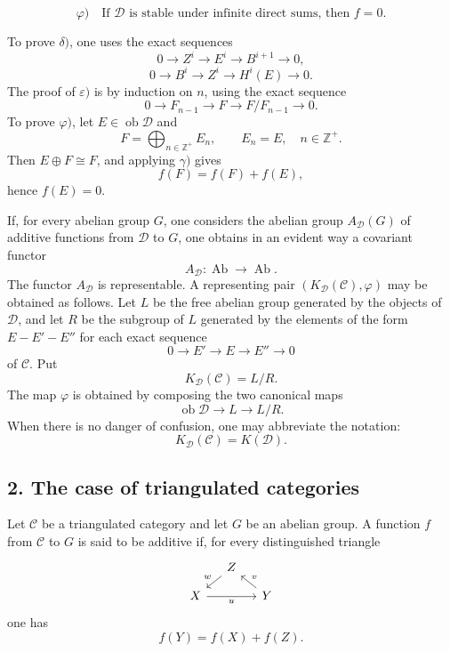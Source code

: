 \documentclass[11pt]{article}
\providecommand{\Ob}{\operatorname{ob}}
\providecommand{\cC}{\mathcal C}
\providecommand{\Ob}{\operatorname{ob}}
\providecommand{\Ab}{\operatorname{Ab}}
\providecommand{\cC}{\mathcal C}
\providecommand{\cD}{\mathcal D}
\providecommand{\Ab}{\operatorname{Ab}}
\providecommand{\Ob}{\operatorname{Ob}}
\providecommand{\Ob}{\operatorname{ob}}
\providecommand{\Ob}{\operatorname{Ob}}
\begin{document}
\[
\varphi)\quad
\text{If }\cD\text{ is stable under infinite direct sums, then }f=0.
\]

To prove $\delta)$, one uses the exact sequences
\[
0\longrightarrow Z^i\longrightarrow E^i\longrightarrow B^{i+1}\longrightarrow 0,
\]
\[
0\longrightarrow B^i\longrightarrow Z^i\longrightarrow H^i(E)\longrightarrow 0.
\]
The proof of $\varepsilon)$ is by induction on $n$, using the exact sequence
\[
0\longrightarrow F_{n-1}\longrightarrow F\longrightarrow F/F_{n-1}\longrightarrow 0.
\]
To prove $\varphi)$, let $E\in\Ob\cD$ and
\[
F=\bigoplus_{n\in\mathbb Z^+}E_n,\qquad E_n=E,\quad n\in\mathbb Z^+.
\]
Then $E\oplus F\cong F$, and applying $\gamma)$ gives
\[
f(F)=f(F)+f(E),
\]
hence $f(E)=0$.

If, for every abelian group $G$, one considers the abelian group $A_{\cD}(G)$ of additive functions from $\cD$ to $G$, one obtains in an evident way a covariant functor
\[
A_{\cD}:\Ab\longrightarrow\Ab.
\]
The functor $A_{\cD}$ is representable. A representing pair $(K_{\cD}(\cC),\varphi)$ may be obtained as follows. Let $L$ be the free abelian group generated by the objects of $\cD$, and let $R$ be the subgroup of $L$ generated by the elements of the form $E-E'-E''$ for each exact sequence
\[
0\longrightarrow E'\longrightarrow E\longrightarrow E''\longrightarrow 0
\]
of $\cC$. Put
\[
K_{\cD}(\cC)=L/R.
\]
The map $\varphi$ is obtained by composing the two canonical maps
\[
\Ob\cD\longrightarrow L\longrightarrow L/R.
\]
When there is no danger of confusion, one may abbreviate the notation:
\[
K_{\cD}(\cC)=K(\cD).
\]

\subsection*{2. The case of triangulated categories}

Let $\cC$ be a triangulated category and let $G$ be an abelian group. A function $f$ from $\cC$ to $G$ is said to be additive if, for every distinguished triangle
\[
\begin{tikzcd}[column sep=small,row sep=small]
& Z \arrow[dl,"w"']\\
X \arrow[rr,"u"'] && Y \arrow[ul,"v"']
\end{tikzcd}
\]
one has
\[
f(Y)=f(X)+f(Z).
\]
\end{document}
